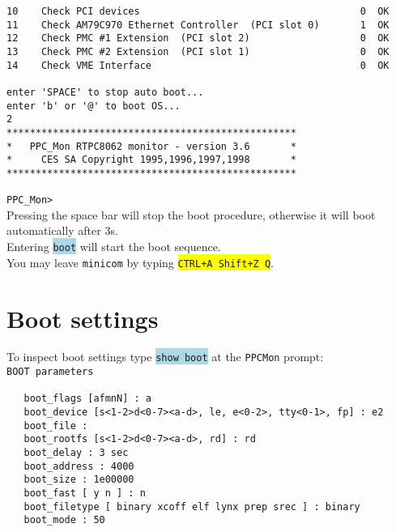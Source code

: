 \documentclass[10pt]{article}
\newcommand{\blue}[1]{\colorbox{lightblue}{\texttt{#1}}}
\newcommand{\yellow}[1]{\colorbox{yellow}{\texttt{#1}}}
\begin{document}
\verb+10    Check PCI devices                                      0  OK+\\
\verb+11    Check AM79C970 Ethernet Controller  (PCI slot 0)       1  OK+\\
\verb+12    Check PMC #1 Extension  (PCI slot 2)                   0  OK+\\
\verb+13    Check PMC #2 Extension  (PCI slot 1)                   0  OK+\\
\verb+14    Check VME Interface                                    0  OK+\\
\verb+ +\\
\verb+enter 'SPACE' to stop auto boot...+\\
\verb+enter 'b' or '@' to boot OS...+\\
\verb+2+\\
\verb+**************************************************+\\
\verb+*   PPC_Mon RTPC8062 monitor - version 3.6       *+\\
\verb+*     CES SA Copyright 1995,1996,1997,1998       *+\\
\verb+**************************************************+\\
\verb+ +\\
\verb+PPC_Mon>+\\

Pressing the space bar will stop the boot procedure, otherwise it will boot automatically after 3s.\\
Entering \blue{boot} will start the boot sequence.\\

You may leave \texttt{minicom} by typing \yellow{CTRL+A Shift+Z Q}.
\newpage
\section{Boot settings}
To inspect boot settings type \blue{show boot} at the \texttt{PPCMon} prompt:\\

\verb+BOOT parameters+\\\label{PPC-Boot}
\verb+ +\\
\verb+   boot_flags [afmnN] : a+\\
\verb+   boot_device [s<1-2>d<0-7><a-d>, le, e<0-2>, tty<0-1>, fp] : e2+\\
\verb+   boot_file :+\\
\verb+   boot_rootfs [s<1-2>d<0-7><a-d>, rd] : rd+\\
\verb+   boot_delay : 3 sec+\\
\verb+   boot_address : 4000+\\
\verb+   boot_size : 1e00000+\\
\verb+   boot_fast [ y n ] : n+\\
\verb+   boot_filetype [ binary xcoff elf lynx prep srec ] : binary+\\
\verb+   boot_mode : 50+\\
\end{document}
